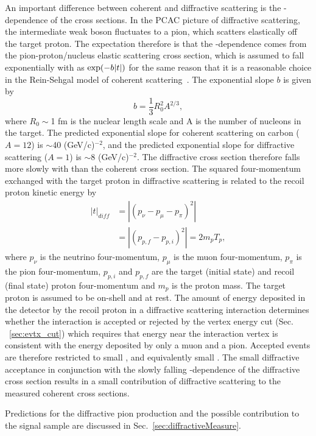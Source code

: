 An important difference between coherent and diffractive scattering is the \tabs-dependence of the cross sections.
In the PCAC picture of diffractive scattering, the intermediate weak boson fluctuates to a pion, which scatters
elastically off the target proton.  The expectation therefore is that the \tabs-dependence comes from the
pion-proton/nucleus elastic scattering cross section, which is assumed to fall exponentially with \tabs as
$\exp(-b|t|)$ for the same reason that it is a reasonable choice in the Rein-Sehgal model of coherent scattering~\cite{bib:RS}.  The exponential slope $b$ is given by
\begin{equation}
b=\frac{1}{3}R_{0}^{2}A^{2/3},
\end{equation}
where $R_{0}\sim$1 fm is the nuclear length scale and A is the number of nucleons in the target.  The predicted
exponential slope for coherent scattering on carbon ($A=12$) is $\sim$40 (GeV/c)$^{-2}$, and the predicted exponential
slope for diffractive scattering ($A=1$) is $\sim$8 (GeV/c)$^{-2}$.  The diffractive cross section therefore falls more
slowly with \tabs than the coherent cross section.  The squared four-momentum exchanged with the target proton in
diffractive scattering \tdiff is related to the recoil proton kinetic energy \Tp by
\begin{eqnarray}
\label{eq:t_diff}
|t|_{diff} & = |(p_{\nu}-p_{\mu}-p_{\pi})^{2}| \nonumber \\
           & = |(p_{p,f}-p_{p,i})^{2}| = 2m_{p}T_{p},
\end{eqnarray}
where $p_{\nu}$ is the neutrino four-momentum, $p_{\mu}$ is the muon four-momentum, $p_{\pi}$ is the pion four-momentum,
$p_{p,i}$ and $p_{p,f}$ are the target (initial state) and recoil (final state) proton four-momentum and $m_{p}$ is the
proton mass.
The target proton is assumed to be on-shell and at rest.
The amount of energy deposited in the detector by the recoil proton in a diffractive scattering interaction determines
whether the interaction is accepted or rejected by the vertex energy cut (Sec. ~\ref{sec:evtx_cut}) which requires that energy near the interaction vertex is consistent with the energy deposited by only a muon and a pion.  Accepted events are therefore restricted to small \Tp,
and equivalently small \tabs.  The small \tabs diffractive acceptance in conjunction with the slowly falling
\tabs-dependence of the diffractive cross section results in a small contribution of diffractive scattering to the
measured coherent cross sections.

Predictions for the diffractive pion production and the possible contribution to the signal sample are discussed in Sec.~\ref{sec:diffractiveMeasure}.
